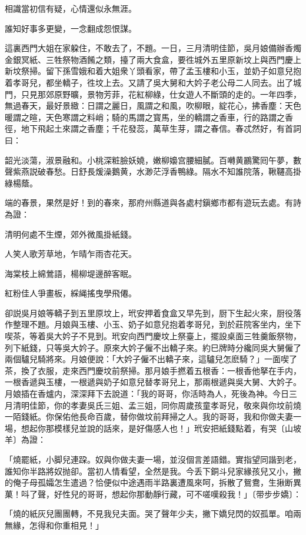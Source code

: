 \begin{myquote}
相識當初信有疑，心情還似永無涯。

誰知好事多更變，一念翻成怨恨謀。
\end{myquote}

這裏西門大姐在家躱住，不敢去了，不題。一日，三月清明佳節，吳月娘備辦香燭金銀冥紙、三牲祭物酒餚之類，擡了兩大食盒，要徃城外五里原新坟上與西門慶上新坟祭掃。留下孫雪娥和着大姐衆丫頭看家，帶了孟玉樓和小玉，並奶子如意兒抱着孝哥兒，都坐轎子，徃坟上去。又請了吳大舅和大妗子老公母二人同去。出了城門，只見那郊原野曠，景物芳菲，花紅柳綠，仕女遊人不斷頭的走的。一年四季，無過春天，最好景緻：日謂之麗日，風謂之和風，吹柳眼，綻花心，拂香塵：天色暖謂之暄，天色寒謂之料峭；騎的馬謂之寳馬，坐的轎謂之香車，行的路謂之香徑，地下飛起土來謂之香塵；千花發蕊，萬草生芽，謂之春信。春忒然好，有首詞曰：

\begin{myquote}
韶光淡蕩，淑景融和。小桃深粧臉妖嬈，嫩柳嬝宫腰細膩。百囀黄鸝驚囘午夢，數聲紫燕説破春愁。日舒長煖澡鵝黄，水渺茫浮香鴨綠。隔水不知誰院落，鞦韆高掛綠楊蔭。
\end{myquote}

端的春景，果然是好！到的春來，那府州縣道與各處村鎭鄉市都有遊玩去處。有詩為證：

\begin{myquote}
清明何處不生煙，郊外微風掛紙錢。

人笑人歌芳草地，乍晴乍雨杏花天。

海棠枝上綿鶯語，楊柳堤邊醉客眠。

紅粉佳人爭畫板，綵䋲搖曳學飛僊。
\end{myquote}

卻説吳月娘等轎子到五里原坟上，玳安押着食盒又早先到，厨下生起火來，厨役落作整理不題。月娘與玉樓、小玉、奶子如意兒抱着孝哥兒，到於莊院客坐内，坐下喫茶，等着吳大妗子不見到。玳安向西門慶坟上祭臺上，擺設桌面三牲羹飯祭物，列下紙錢，只等吳大妗子。原來大妗子僱不出轎子來。約巳牌時分纔同吳大舅僱了兩個驢兒騎將來。月娘便說：「大妗子僱不出轎子來，這驢兒怎麽騎？」一面喫了茶，換了衣服，走來西門慶坟前祭掃。那月娘手撚着五根香：一根香他拏在手内，一根香遞與玉樓，一根遞與奶子如意兒替孝哥兒上，那兩根遞與吳大舅、大妗子。月娘插在香爐内，深深拜下去說道：「我的哥哥，你活時為人，死後為神。今日三月清明佳節，你的孝妻吳氏三姐、孟三姐，同你周歲孩童孝哥兒，敬來與你坟前燒一陌錢紙。你保佑他長命百歲，替你做坟前拜掃之人。我的哥哥，我和你做夫妻一場，想起你那模樣兒並說的話來，是好傷感人也！」玳安把紙錢點着，有哭〔山坡羊〕為證：

\begin{myquote}
「燒罷紙，小脚兒連跥。奴與你做夫妻一場，並沒個言差語錯。實指望同諧到老，誰知你半路將奴抛卻。當初人情看望，全然是我。今丢下銅斗兒家緣孩兒又小，撇的俺子母孤孀怎生遣過？恰便似中途遇雨半路裏遭風來呵，拆散了鴛鴦，生揪断異菓！呌了聲，好性兒的哥哥，想起你那動靜行藏，可不嗟嘆殺我！」{\marktext\small〔带步步嬌〕}：

「燒的紙灰兒團團轉，不見我兒夫面。哭了聲年少夫，撇下嬌兒閃的奴孤單。咱兩無緣，怎得和你重相見！」
\end{myquote}

